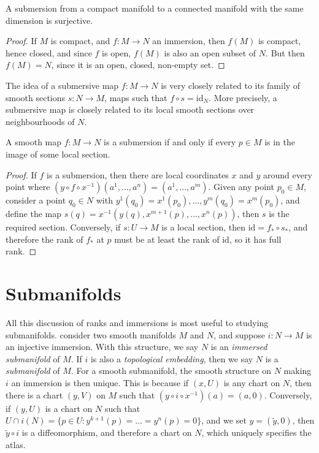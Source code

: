 \begin{corollary}
    A submersion from a compact manifold to a connected manifold with the same dimension is surjective.
\end{corollary}
\begin{proof}
    If $M$ is compact, and $f: M \to N$ an immersion, then $f(M)$ is compact, hence closed, and since $f$ is open, $f(M)$ is also an open subset of $N$. But then $f(M) = N$, since it is an open, closed, non-empty set.
\end{proof}

The idea of a submersive map $f: M \to N$ is very closely related to its family of smooth sections $s: N \to M$, maps such that $f \circ s = \text{id}_N$. More precisely, a submersive map is closely related to its local smooth sections over neighbourhoods of $N$.

\begin{theorem}
    A smooth map $f: M \to N$ is a submersion if and only if every $p \in M$ is in the image of some local section.
\end{theorem}
\begin{proof}
    If $f$ is a submersion, then there are local coordinates $x$ and $y$ around every point where $(y \circ f \circ x^{-1})(a^1, \dots, a^n) = (a^1, \dots, a^m)$. Given any point $p_0 \in M$, consider a point $q_0 \in N$ with $y^1(q_0) = x^1(p_0), \dots, y^m(q_0) = x^m(p_0)$, and define the map $s(q) = x^{-1}(y(q), x^{m+1}(p), \dots, x^n(p))$, then $s$ is the required section. Conversely, if $s: U \to M$ is a local section, then $\text{id} = f_* \circ s_*$, and therefore the rank of $f_*$ at $p$ must be at least the rank of $\text{id}$, so it has full rank.
\end{proof}

\section{Submanifolds}

All this discussion of ranks and immersions is most useful to studying submanifolds. consider two smooth manifolds $M$ and $N$, and suppose $i: N \to M$ is an injective immersion. With this structure, we say $N$ is an \emph{immersed submanifold} of $M$. If $i$ is also a \emph{topological embedding}, then we say $N$ is a \emph{submanifold} of $M$. For a smooth submanifold, the smooth structure on $N$ making $i$ an immersion is then unique. This is because if $(x,U)$ is any chart on $N$, then there is a chart $(y,V)$ on $M$ such that $(y \circ i \circ x^{-1})(a) = (a,0)$. Conversely, if $(y,U)$ is a chart on $N$ such that $U \cap i(N) = \{ p \in U : y^{k+1}(p) = \dots = y^n(p) = 0 \}$, and we set $y = (\tilde{y},0)$, then $\tilde{y} \circ i$ is a diffeomorphism, and therefore a chart on $N$, which uniquely specifies the atlas.

